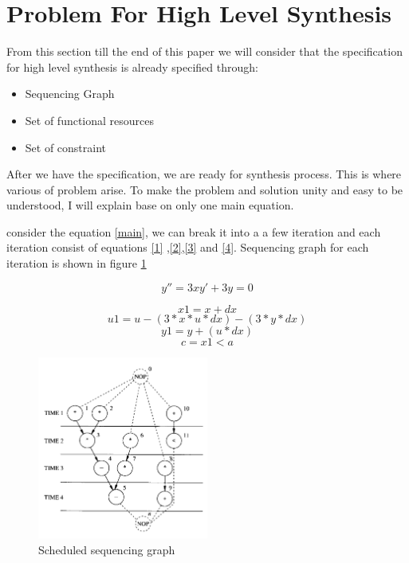 

\section{Problem For High Level Synthesis}

From this section till the end of this paper we will consider that the specification for high level synthesis is already specified through:

\begin{itemize}
\item Sequencing Graph
\item Set of functional resources
\item Set of constraint
\end{itemize}

After we have the specification, we are ready for synthesis process. This is where various of problem arise. To make the problem and solution unity and easy to be understood, I will explain base on only one main equation. 

consider the equation \ref{main}, we can break it into a a few iteration and each iteration consist of equations \ref{1} ,\ref{2},\ref{3} and \ref{4}. Sequencing graph for each iteration is shown in figure \ref{fig:Scheduled_sequencing_graph}

\begin{equation}\label{main}
 y'' = 3xy'+ 3y =0
\end{equation}

\begin{equation}\label{1}
 x1=x+dx
\end{equation}
\begin{equation}\label{2}
u1 = u -(3*x*u*dx)-(3*y*dx)
\end{equation}
\begin{equation}\label{3}
 y1 =y+(u*dx)
\end{equation}
\begin{equation}\label{4}
 c = x1<a
\end{equation}


\begin{figure}[h]
    \centering
    \includegraphics[width=0.5\textwidth]{scheduled_sequencing_graph}
    \caption{ Scheduled sequencing graph \cite{b1}}
    \label{fig:Scheduled_sequencing_graph}
\end{figure}


